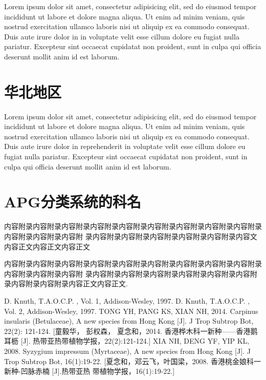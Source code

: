 \documentclass[utf8]{book}
\begin{document}
\begin{multicols}{2}
Lorem ipsum dolor sit amet, consectetur adipisicing elit, sed do eiusmod
tempor incididunt ut labore et dolore magna aliqua. Ut enim ad minim veniam,
quis nostrud exercitation ullamco laboris nisi ut aliquip ex ea commodo
consequat. Duis aute irure dolor in  in voluptate velit
esse cillum dolore eu fugiat nulla pariatur. Excepteur sint occaecat
cupidatat non proident, sunt in culpa qui officia deserunt mollit anim id est
laborum.
\end{multicols}

\chapter{华北地区}
\begin{multicols}{2}
Lorem ipsum dolor sit amet, consectetur adipisicing elit, sed do eiusmod
tempor incididunt ut labore et dolore magna aliqua. Ut enim ad minim veniam,
quis nostrud exercitation ullamco laboris nisi ut aliquip ex ea commodo
consequat. Duis aute irure dolor in reprehenderit in voluptate velit esse
cillum dolore eu fugiat nulla pariatur. Excepteur sint occaecat cupidatat non
proident, sunt in culpa qui officia deserunt mollit anim id est laborum.
\end{multicols}



\appendix

\chapter{APG分类系统的科名}

内容附录内容附录内容附录内容附录内容附录内容附录内容附录内容附录内容附录内容附录内容附录内容附
录内容附录内容附录内容附录内容附录内容附录内容文内容正文内容正文内容正文

内容附录内容附录内容附录内容附录内容附录内容附录内容附录内容附录内容附录内容附录内容附录内容附
录内容附录内容附录内容附录内容附录内容附录内容附录内容附录内容附录内容正文内容正文\cite{DK1}.

\renewcommand\indexname{索~~引}
\printindex {}

\backmatter


\begin{thebibliography}{参考文献}
 D. Knuth, T.A.O.C.P. , Vol. 1,
    Addison-Wesley, 1997.
 D. Knuth, T.A.O.C.P. , Vol. 2, Addison-Wesley, 1997.
 TONG YH, PANG KS, XIAN NH, 2014. Carpinus
    insularis (Betulaceae), A new species from Hong Kong [J]. J Trop Subtrop
    Bot, 22(2): 121-124. [童毅华， 彭权森， 夏念和，2014. 香港桦木科一新种——香港鹅耳枥
    [J]. 热带亚热带植物学报，22(2):121-124.]
 XIA NH, DENG YF, YIP KL, 2008. Syzygium impressum
    (Myrtaceae), A new species from Hong Kong [J]. J Trop Subtrop Bot,
    16(1):19-22. [夏念和，邓云飞，叶国梁，2008. 香港桃金娘科一新种-凹脉赤楠 [J].热带亚热
    带植物学报，16(1):19-22.]
\end{thebibliography}
\end{document}
